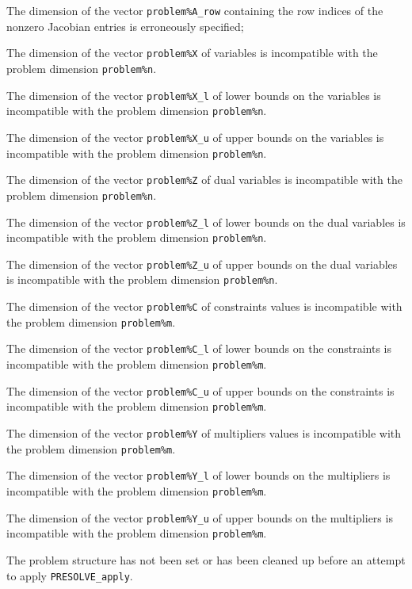\documentclass{galahad}
\newcommand{\packagename}{PRESOLVE}
\begin{document}
\begin{description}
 The dimension of the vector {\tt problem\%A\_row} containing the
row indices of the nonzero Jacobian entries is erroneously specified;

 The dimension of the vector {\tt problem\%X} of variables is 
incompatible with the problem dimension {\tt problem\%n}.

 The dimension of the vector {\tt problem\%X\_l} of lower bounds on
the variables is incompatible with the problem dimension {\tt problem\%n}.

 The dimension of the vector {\tt problem\%X\_u} of upper bounds on
the variables is incompatible with the problem dimension {\tt problem\%n}.

 The dimension of the vector {\tt problem\%Z} of dual variables is 
incompatible with the problem dimension {\tt problem\%n}.

 The dimension of the vector {\tt problem\%Z\_l} of lower bounds on
the dual variables is incompatible with the problem dimension {\tt problem\%n}.

 The dimension of the vector {\tt problem\%Z\_u} of upper bounds on
the dual variables is incompatible with the problem dimension {\tt problem\%n}.

 The dimension of the vector {\tt problem\%C} of constraints values is
incompatible with the problem dimension {\tt problem\%m}.

 The dimension of the vector {\tt problem\%C\_l} of lower bounds on
the constraints is incompatible with the problem dimension {\tt problem\%m}.

 The dimension of the vector {\tt problem\%C\_u} of upper bounds on
the constraints is incompatible with the problem dimension {\tt problem\%m}.

 The dimension of the vector {\tt problem\%Y} of multipliers values is
incompatible with the problem dimension {\tt problem\%m}.

 The dimension of the vector {\tt problem\%Y\_l} of lower bounds on
the multipliers is incompatible with the problem dimension {\tt problem\%m}.

 The dimension of the vector {\tt problem\%Y\_u} of upper bounds on
the multipliers is incompatible with the problem dimension {\tt problem\%m}.

 The problem structure has not been set or has been 
cleaned up before an attempt to apply {\tt \packagename\_apply}.


\end{description}
\end{document}
